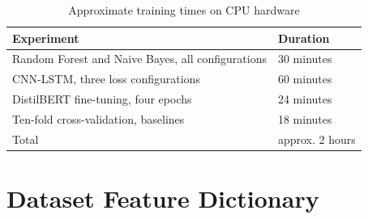 \documentclass[12pt,a4paper,oneside]{report}
\newcommand{\tabfont}{\fontsize{11}{13}\selectfont\setlength{\tabcolsep}{4pt}}
\begin{document}
\begin{table}[H]
\centering
\caption{Approximate training times on CPU hardware}
\label{tab:times}
\tabfont
\begin{tabular}{L{60mm}C{35mm}}
\toprule
\textbf{Experiment} & \textbf{Duration} \\
\midrule
Random Forest and Naive Bayes, all configurations & 30 minutes \\
CNN-LSTM, three loss configurations               & 60 minutes \\
DistilBERT fine-tuning, four epochs               & 24 minutes \\
Ten-fold cross-validation, baselines              & 18 minutes \\
\midrule
Total                                             & approx. 2 hours \\
\bottomrule
\end{tabular}
\end{table}

\clearpage

\chapter{Dataset Feature Dictionary}
\label{app:d}
\end{document}
